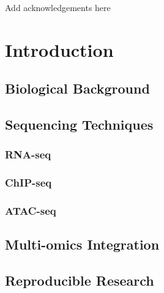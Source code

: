 \documentclass[b5paper, oneside, british, intoc, bibliograph=totoc, index=totoc, BCOR10mm, twoside, openright]{book}
\numberwithin{equation}{section}
\numberwithin{figure}{section}
\begin{document}
\cleardoublepage
{}

Add acknowledgements here
%

\cleardoublepage


%


\hypersetup{hidelinks} %

\pagestyle{plain}\tableofcontents

\cleardoublepage{}
\pagestyle{fancy}


%
\newpage
{}

\chapter{Introduction} \label{sec:introchap}

\section{Biological Background} \label{sec:bioback}

\section{Sequencing Techniques}\label{sec:seqs}

\subsection{RNA-seq} \label{sec:rnaseq}

\subsection{ChIP-seq} \label{sec:chipseq}

\subsection{ATAC-seq} \label{sec:atacseq}

\section{Multi-omics Integration} \label{sec:integration}

\section{Reproducible Research} \label{sec:reprres}

\end{document}
